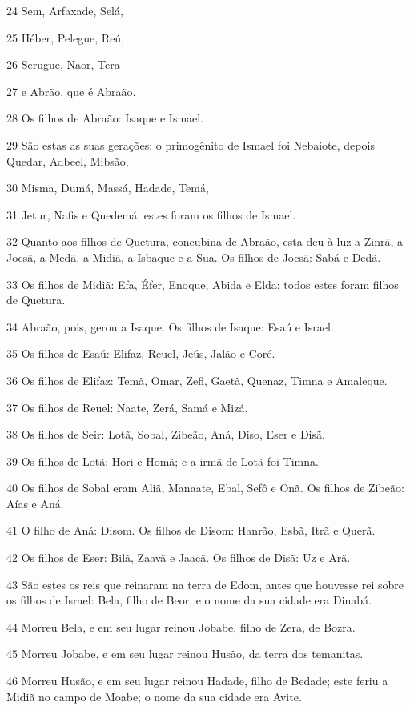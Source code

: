\par 24 Sem, Arfaxade, Selá,
\par 25 Héber, Pelegue, Reú,
\par 26 Serugue, Naor, Tera
\par 27 e Abrão, que é Abraão.
\par 28 Os filhos de Abraão: Isaque e Ismael.
\par 29 São estas as suas gerações: o primogênito de Ismael foi Nebaiote, depois Quedar, Adbeel, Mibsão,
\par 30 Misma, Dumá, Massá, Hadade, Temá,
\par 31 Jetur, Nafis e Quedemá; estes foram os filhos de Ismael.
\par 32 Quanto aos filhos de Quetura, concubina de Abraão, esta deu à luz a Zinrã, a Jocsã, a Medã, a Midiã, a Isbaque e a Sua. Os filhos de Jocsã: Sabá e Dedã.
\par 33 Os filhos de Midiã: Efa, Éfer, Enoque, Abida e Elda; todos estes foram filhos de Quetura.
\par 34 Abraão, pois, gerou a Isaque. Os filhos de Isaque: Esaú e Israel.
\par 35 Os filhos de Esaú: Elifaz, Reuel, Jeús, Jalão e Coré.
\par 36 Os filhos de Elifaz: Temã, Omar, Zefi, Gaetã, Quenaz, Timna e Amaleque.
\par 37 Os filhos de Reuel: Naate, Zerá, Samá e Mizá.
\par 38 Os filhos de Seir: Lotã, Sobal, Zibeão, Aná, Diso, Eser e Disã.
\par 39 Os filhos de Lotã: Hori e Homã; e a irmã de Lotã foi Timna.
\par 40 Os filhos de Sobal eram Aliã, Manaate, Ebal, Sefô e Onã. Os filhos de Zibeão: Aías e Aná.
\par 41 O filho de Aná: Disom. Os filhos de Disom: Hanrão, Esbã, Itrã e Querã.
\par 42 Os filhos de Eser: Bilã, Zaavã e Jaacã. Os filhos de Disã: Uz e Arã.
\par 43 São estes os reis que reinaram na terra de Edom, antes que houvesse rei sobre os filhos de Israel: Bela, filho de Beor, e o nome da sua cidade era Dinabá.
\par 44 Morreu Bela, e em seu lugar reinou Jobabe, filho de Zera, de Bozra.
\par 45 Morreu Jobabe, e em seu lugar reinou Husão, da terra dos temanitas.
\par 46 Morreu Husão, e em seu lugar reinou Hadade, filho de Bedade; este feriu a Midiã no campo de Moabe; o nome da sua cidade era Avite.
